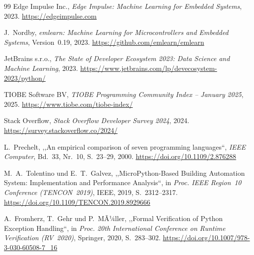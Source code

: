 ﻿\documentclass[12pt,a4paper,twoside]{article}
\newcommand{\doi}[1]{\url{https://doi.org/#1}}
\begin{document}
\begin{thebibliography}{99}
  {Edge Impulse Inc.},
  \textit{Edge Impulse: Machine Learning for Embedded Systems}, 2023.
  \url{https://edgeimpulse.com}

  J.~Nordby,
  \textit{emlearn: Machine Learning for Microcontrollers and Embedded Systems},
  Version~0.19, 2023.
  \url{https://github.com/emlearn/emlearn}

  {JetBrains s.r.o.},
  \textit{The State of Developer Ecosystem 2023: Data Science and Machine Learning},
  2023.
  \url{https://www.jetbrains.com/lp/devecosystem-2023/python/}


  {TIOBE Software BV},
  \textit{TIOBE Programming Community Index -- January 2025},
  2025.
  \url{https://www.tiobe.com/tiobe-index/}

  {Stack Overflow},
  \textit{Stack Overflow Developer Survey 2024}, 2024.
  \url{https://survey.stackoverflow.co/2024/}


  L.~Prechelt,
  ,,An empirical comparison of seven programming languages``,
  \textit{IEEE Computer}, Bd.~33, Nr.~10, S.~23--29, 2000.
  \doi{10.1109/2.876288}


  M.~A.~Tolentino und E.~T.~Galvez,
  ,,MicroPython-Based Building Automation System: Implementation and
  Performance Analysis``,
  in \textit{Proc. IEEE Region~10 Conference (TENCON~2019)},
  IEEE, 2019, S.~2312--2317.
  \doi{10.1109/TENCON.2019.8929666}


  A.~Fromherz, T.~Gehr und P.~MÃ¼ller,
  ,,Formal Verification of Python Exception Handling``,
  in \textit{Proc. 20th International Conference on Runtime Verification
  (RV~2020)}, Springer, 2020, S.~283--302.
  \doi{10.1007/978-3-030-60508-7\_16}

\end{thebibliography}
\end{document}
